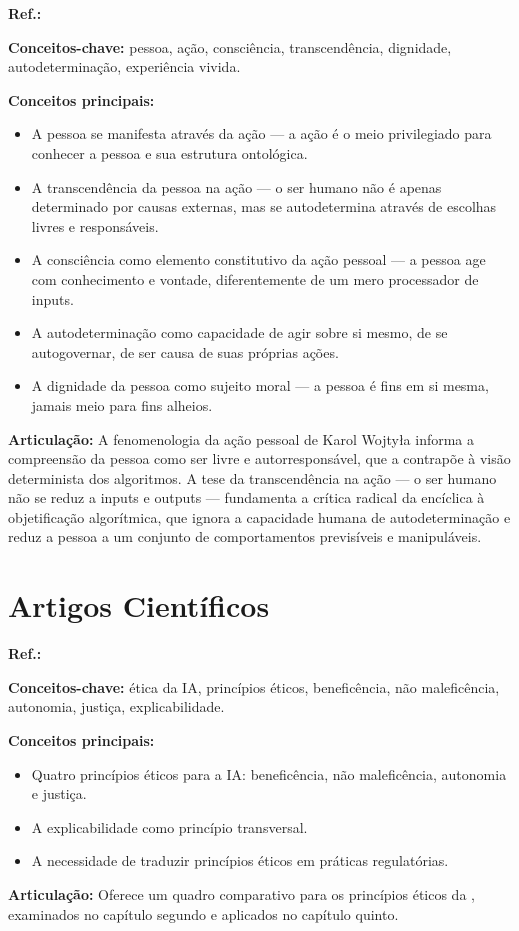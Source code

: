 \begin{fichamento}
    \textbf{Ref.:} \cite{Wojtyla1979PA}
    
    \textbf{Conceitos-chave:} pessoa, ação, consciência, transcendência, dignidade, autodeterminação, experiência vivida.
    
    \textbf{Conceitos principais:}
    \begin{itemize}
        \item A pessoa se manifesta através da ação — a ação é o meio privilegiado para conhecer a pessoa e sua estrutura ontológica.
        \item A transcendência da pessoa na ação — o ser humano não é apenas determinado por causas externas, mas se autodetermina através de escolhas livres e responsáveis.
        \item A consciência como elemento constitutivo da ação pessoal — a pessoa age com conhecimento e vontade, diferentemente de um mero processador de inputs.
        \item A autodeterminação como capacidade de agir sobre si mesmo, de se autogovernar, de ser causa de suas próprias ações.
        \item A dignidade da pessoa como sujeito moral — a pessoa é fins em si mesma, jamais meio para fins alheios.
    \end{itemize}
    
    \textbf{Articulação:} A fenomenologia da ação pessoal de Karol Wojtyła informa a compreensão da pessoa como ser livre e autorresponsável, que a \MH{} contrapõe à visão determinista dos algoritmos. A tese da transcendência na ação — o ser humano não se reduz a inputs e outputs — fundamenta a crítica radical da encíclica à objetificação algorítmica, que ignora a capacidade humana de autodeterminação e reduz a pessoa a um conjunto de comportamentos previsíveis e manipuláveis.
\end{fichamento}

\section{Artigos Científicos}

\begin{fichamento}
    \textbf{Ref.:} \cite{Floridi2018AIG}
    
    \textbf{Conceitos-chave:} ética da IA, princípios éticos, beneficência, não maleficência, autonomia, justiça, explicabilidade.
    
    \textbf{Conceitos principais:}
    \begin{itemize}
        \item Quatro princípios éticos para a IA: beneficência, não maleficência, autonomia e justiça.
        \item A explicabilidade como princípio transversal.
        \item A necessidade de traduzir princípios éticos em práticas regulatórias.
    \end{itemize}
    
    \textbf{Articulação:} Oferece um quadro comparativo para os princípios éticos da \MH{}, examinados no capítulo segundo e aplicados no capítulo quinto.
\end{fichamento}

